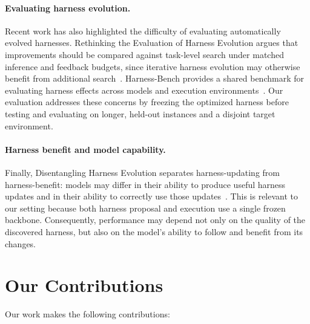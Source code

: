\documentclass[letterpaper]{article} %
\begin{document}
\paragraph{Evaluating harness evolution.}
Recent work has also highlighted the difficulty of evaluating automatically evolved harnesses. Rethinking the Evaluation of Harness Evolution argues that improvements should be compared against task-level search under matched inference and feedback budgets, since iterative harness evolution may otherwise benefit from additional search~\citep{wang2026rethinkeval}. Harness-Bench provides a shared benchmark for evaluating harness effects across models and execution environments~\citep{yao2026harnessbench}. Our evaluation addresses these concerns by freezing the optimized harness before testing and evaluating on longer, held-out instances and a disjoint target environment.

\paragraph{Harness benefit and model capability.}
Finally, Disentangling Harness Evolution separates harness-updating from harness-benefit: models may differ in their ability to produce useful harness updates and in their ability to correctly use those updates~\citep{lin2026disentangling}. This is relevant to our setting because both harness proposal and execution use a single frozen backbone. Consequently, performance may depend not only on the quality of the discovered harness, but also on the model's ability to follow and benefit from its changes.

\section{Our Contributions}

Our work makes the following contributions:
\end{document}
